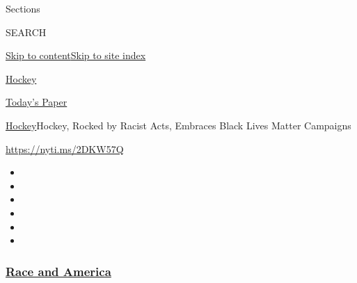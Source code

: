 Sections

SEARCH

\protect\hyperlink{site-content}{Skip to
content}\protect\hyperlink{site-index}{Skip to site index}

\href{https://www.nytimes3xbfgragh.onion/section/sports/hockey}{Hockey}

\href{https://myaccount.nytimes3xbfgragh.onion/auth/login?response_type=cookie\&client_id=vi}{}

\href{https://www.nytimes3xbfgragh.onion/section/todayspaper}{Today's
Paper}

\href{/section/sports/hockey}{Hockey}\textbar{}Hockey, Rocked by Racist
Acts, Embraces Black Lives Matter Campaigns

\url{https://nyti.ms/2DKW57Q}

\begin{itemize}
\item
\item
\item
\item
\item
\item
\end{itemize}

\hypertarget{race-and-america}{%
\subsubsection{\texorpdfstring{\href{https://www.nytimes3xbfgragh.onion/news-event/george-floyd-protests-minneapolis-new-york-los-angeles?name=styln-george-floyd\&region=TOP_BANNER\&variant=undefined\&block=storyline_menu_recirc\&action=click\&pgtype=Article\&impression_id=434dc170-e38b-11ea-8c52-fd2265771867}{Race
and America}}{Race and America}}\label{race-and-america}}

